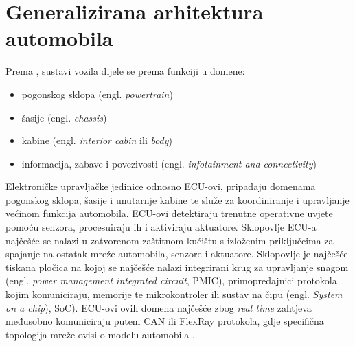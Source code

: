 \documentclass[times, utf8, diplomski, numeric]{fer}
\begin{document}
\section{Generalizirana arhitektura automobila}
Prema \cite{nasser2023automotive, koscher2010, knight2020hacking, huq2020driving, aliwa2021cyberattacks}, sustavi vozila dijele se prema funkciji u domene:

\begin{itemize}
    \item pogonskog sklopa (engl. \textit{powertrain})
    \item šasije (engl. \textit{chassis})
    \item kabine (engl. \textit{interior cabin} ili \textit{body})
    \item informacija, zabave i povezivosti (engl. \textit{infotainment and connectivity})
\end{itemize}

Elektroničke upravljačke jedinice odnosno ECU-ovi, pripadaju domenama pogonskog sklopa, šasije i unutarnje kabine te služe za koordiniranje i upravljanje većinom funkcija automobila. ECU-ovi detektiraju trenutne operativne uvjete pomoću senzora, procesuiraju ih i aktiviraju aktuatore\cite{bosch2022handbook}. Sklopovlje ECU-a najčešće se nalazi u zatvorenom zaštitnom kućištu s izloženim priključcima za spajanje na ostatak mreže automobila, senzore i aktuatore. Sklopovlje je najčešće tiskana pločica na kojoj se najčešće nalazi integrirani krug za upravljanje snagom (engl. \textit{power management integrated circuit}, PMIC), primopredajnici protokola kojim komuniciraju, memorije te mikrokontroler ili sustav na čipu (engl. \textit{System on a chip}), SoC)\cite{nasser2023automotive}. ECU-ovi ovih domena najčešće zbog \textit{real time} zahtjeva međusobno komuniciraju putem CAN ili FlexRay protokola, gdje specifična topologija mreže ovisi o modelu automobila \cite{bosch2022handbook}.
\end{document}
